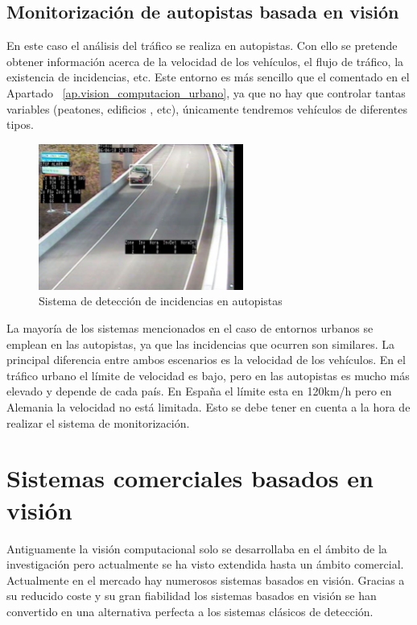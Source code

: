 \subsection{Monitorización de autopistas basada en visión}

En este caso el análisis del tráfico se realiza en autopistas. Con ello se pretende obtener información acerca de la velocidad de los vehículos, el flujo de tráfico, la existencia de incidencias, etc. Este entorno es más sencillo que el comentado en el Apartado ~\ref{ap.vision_computacion_urbano}, ya que no hay que controlar tantas variables (peatones, edificios , etc), únicamente tendremos vehículos de diferentes tipos. 

\begin{figure}[H]
  \begin{center}
    \includegraphics[width=0.6\textwidth]{figures/Introduccion/deteccion_autopistas.jpg}
		\caption{Sistema de detección de incidencias en autopistas}
		\label{fig.deteccion_autopistas}
		\end{center}
\end{figure}

La mayoría de los sistemas mencionados en el caso de entornos urbanos se emplean en las autopistas, ya que las incidencias que ocurren son similares. La principal diferencia entre ambos escenarios es la velocidad de los vehículos. En el tráfico urbano el límite de velocidad es bajo, pero en las autopistas es mucho más elevado y depende de cada país. En España el límite esta en 120km/h pero en Alemania la velocidad no está limitada. Esto se debe tener en cuenta a la hora de realizar el sistema de monitorización.

\section{Sistemas comerciales basados en visión}

Antiguamente la visión computacional solo se desarrollaba en el ámbito de la investigación pero actualmente se ha visto extendida hasta un ámbito comercial. Actualmente en el mercado hay numerosos sistemas basados en visión. Gracias a su reducido coste y su gran fiabilidad los sistemas basados en visión se han convertido en una alternativa perfecta a los sistemas clásicos de detección.

